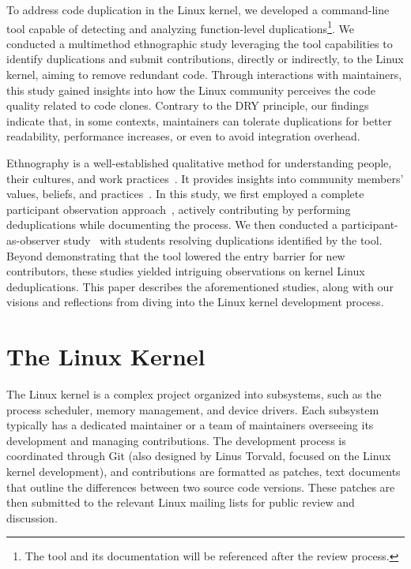 \documentclass[sigconf]{acmart}
\begin{document}
To address code duplication in the Linux kernel, we developed a command-line tool capable of detecting and analyzing function-level duplications\footnote{The tool and its documentation will be referenced after the review process.}. We conducted a multimethod ethnographic study leveraging the tool capabilities to identify duplications and submit contributions, directly or indirectly, to the Linux kernel, aiming to remove redundant code.
%
Through interactions with maintainers, this study gained insights into how the Linux community perceives the code quality related to code clones. Contrary to the DRY principle, our findings indicate that, in some contexts, maintainers can tolerate duplications for better readability, performance increases, or even to avoid integration overhead.

Ethnography is a well-established qualitative method for understanding people, their cultures, and work practices~\cite{bookethno}. It provides insights into community members' values, beliefs, and practices~\cite{ethnosoft}. In this study, we first employed a complete participant observation approach~\cite{gold1958roles}, actively contributing by performing deduplications while documenting the process. We then conducted a participant-as-observer study~\cite{gold1958roles} with students resolving duplications identified by the tool. Beyond demonstrating that the tool lowered the entry barrier for new contributors, these studies yielded intriguing observations on kernel Linux deduplications. This paper describes the aforementioned studies, along with our visions and reflections from diving into the Linux kernel development process.

\section{The Linux Kernel}

The Linux kernel is a complex project organized into subsystems, such as the process scheduler, memory management, and device drivers. Each subsystem typically has a dedicated maintainer or a team of maintainers overseeing its development and managing contributions. The development process is coordinated through Git (also designed by Linus Torvald, focused on the Linux kernel development), and contributions are formatted as patches, text documents that outline the differences between two source code versions. These patches are then submitted to the relevant Linux mailing lists for public review and discussion.
\end{document}

